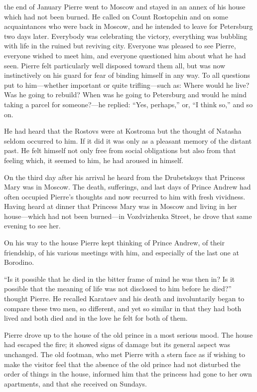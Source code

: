  the end of January Pierre went to Moscow and stayed in an
annex of his house which had not been burned. He called on Count
Rostopchin and on some acquaintances who were back in Moscow, and
he intended to leave for Petersburg two days later. Everybody was
celebrating the victory, everything was bubbling with life in the
ruined but reviving city.  Everyone was pleased to see Pierre,
everyone wished to meet him, and everyone questioned him about
what he had seen. Pierre felt particularly well disposed toward
them all, but was now instinctively on his guard for fear of
binding himself in any way. To all questions put to him---whether
important or quite trifling---such as: Where would he live? Was
he going to rebuild? When was he going to Petersburg and would he
mind taking a parcel for someone?---he replied: ``Yes, perhaps,''
or, ``I think so,'' and so on.

He had heard that the Rostovs were at Kostroma but the thought of
Natasha seldom occurred to him. If it did it was only as a
pleasant memory of the distant past. He felt himself not only
free from social obligations but also from that feeling which, it
seemed to him, he had aroused in himself.

On the third day after his arrival he heard from the Drubetskoys
that Princess Mary was in Moscow. The death, sufferings, and last
days of Prince Andrew had often occupied Pierre's thoughts and
now recurred to him with fresh vividness. Having heard at dinner
that Princess Mary was in Moscow and living in her house---which
had not been burned---in Vozdvizhenka Street, he drove that same
evening to see her.

On his way to the house Pierre kept thinking of Prince Andrew, of
their friendship, of his various meetings with him, and
especially of the last one at Borodino.

``Is it possible that he died in the bitter frame of mind he was
then in?  Is it possible that the meaning of life was not
disclosed to him before he died?'' thought Pierre. He recalled
Karataev and his death and involuntarily began to compare these
two men, so different, and yet so similar in that they had both
lived and both died and in the love he felt for both of them.

Pierre drove up to the house of the old prince in a most serious
mood.  The house had escaped the fire; it showed signs of damage
but its general aspect was unchanged. The old footman, who met
Pierre with a stern face as if wishing to make the visitor feel
that the absence of the old prince had not disturbed the order of
things in the house, informed him that the princess had gone to
her own apartments, and that she received on Sundays.

